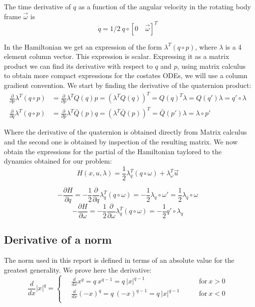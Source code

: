 The time derivative of $q$ as a function of the angular velocity in the rotating body frame $\vec{\omega}$ is 
\begin{equation}
\dot{q} = 1/2  \ q \circ [0 \quad \vec{\omega}]^T
\end{equation}

In the Hamiltonian we get an expression of the form $\lambda^T (q \circ p)$, where $\lambda$ is a 4 element column vector. This expression is scalar. Expressing it as a matrix product we can find its derivative with respect to $q$ and $p$, using matrix calculus to obtain more compact expressions for the costates ODEs, we will use a column gradient convention. We start by finding the derivative of the quaternion product:
\begin{align}
\frac{\partial}{\partial p} \lambda^T (q \circ p) &= \frac{\partial}{\partial p} \lambda^T Q(q) p = (\lambda^T Q(q))^T = Q(q)^T \lambda = Q(q') \lambda = q'\circ \lambda \\
\frac{\partial}{\partial q} \lambda^T (q \circ p) &= \frac{\partial}{\partial p} \lambda^T \bar{Q}(p) q = (\lambda^T \bar{Q}(p))^T = \bar{Q}(p') \lambda = \lambda \circ p'
\end{align}

Where the derivative of the quaternion is obtained directly from Matrix calculus and the second one is obtained by inspection of the resulting matrix. We now obtain the expressions for the partial of the Hamiltonian taylored to the dynamics obtained for our problem:
\begin{equation}
H(x,u,\lambda) = \frac{1}{2} \lambda_q^T (q \circ \omega) + \lambda_\omega^T \vec{u}
\end{equation}

\begin{equation}
 - \frac{\partial H}{\partial q} = - \frac{1}{2} \frac{\partial}{\partial q}  \lambda_q^T (q \circ \omega) = - \frac{1}{2} \lambda_q \circ \omega' = \frac{1}{2} \lambda_q \circ \omega
\end{equation}
\begin{equation}
- \frac{\partial H}{\partial \omega} = - \frac{1}{2} \frac{\partial}{\partial \omega}  \lambda_q^T (q \circ \omega) = - \frac{1}{2} q' \circ \lambda_q
\end{equation}

\subsection{Derivative of a norm}
The norm used in this report is defined in terms of an absolute value for the greatest generality. We prove here the derivative:
\begin{equation}
\frac{d}{dx}|x|^q = 
\begin{cases}
\quad \frac{d}{dx}x^q = q \ x^{q-1} = q \ |x|^{q-1}\qquad &\text{for} \ x>0 \\
\quad \frac{d}{dx} (-x)^q = q \ (-x)^{q-1} =q \ |x|^{q-1} \qquad &\text{for} \ x<0 \\
\end{cases}
\end{equation}

